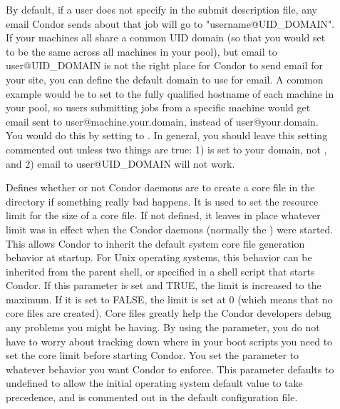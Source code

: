 \begin{description}
\item[] \label{param:EmailDomain}
  By default, if a user does not specify  in the
  submit description file, any email Condor sends about that job will
  go to "username@UID\_DOMAIN".
  If your machines all share a common UID domain (so that you would
  set  to be the same across all machines in your
  pool), but email to user@UID\_DOMAIN is not the right place for
  Condor to send email for your site, you can define the default
  domain to use for email.
  A common example would be to set  to the fully
  qualified hostname of each machine in your pool, so users submitting
  jobs from a specific machine would get email sent to
  user@machine.your.domain, instead of user@your.domain.  
  You would do this by setting  to
  . 
  In general, you should leave this setting commented out unless two
  things are true: 1)  is set to your domain, not
  , and 2) email to user@UID\_DOMAIN will not 
  work. 
  
\item[] \label{param:CreateCoreFiles}
  Defines whether or not Condor daemons are to
  create a core file in the  directory
  if something really bad happens.  It is
  used to set
  the resource limit for the size of a core file.  If not defined,
  it leaves in place whatever limit was in effect
  when the Condor daemons (normally the ) were started.
  This allows Condor to inherit the default system core file generation
  behavior at startup.  For Unix operating systems, this behavior can
  be inherited from the parent shell, or specified in a shell script
  that starts Condor.
  If this parameter is set and TRUE, the limit is increased to
  the maximum.  If it is set to FALSE, the limit is set at 0
  (which means that no core files are created).  Core files
  greatly help the Condor developers debug any problems you might be
  having.  By using the parameter, you do not have to worry about
  tracking down where in your boot scripts you need to set the core
  limit before starting Condor. You set the parameter
  to whatever behavior you want Condor to enforce.  This parameter
  defaults to undefined to allow the initial operating system default
  value to take precedence, 
  and is commented out in the default configuration file. 


\end{description}

